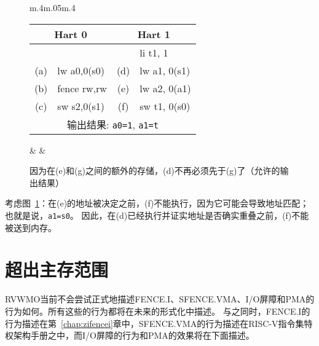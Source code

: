 \begin{figure}[h!]
  \centering
  \begin{tabular}{m{.4\linewidth}m{.05\linewidth}m{.4\linewidth}}
    \tt\small
    \begin{tabular}{cl||cl}
    \multicolumn{2}{c}{Hart 0} & \multicolumn{2}{c}{Hart 1} \\
    \hline
        &             &     & li t1, 1       \\
    (a) & lw a0,0(s0) & (d) & lw a1, 0(s1)   \\
    (b) & fence rw,rw & (e) & lw a2, 0(a1)   \\
    (c) & sw s2,0(s1) & (f) & sw t1, 0(s0)   \\
    \hline
    \multicolumn{4}{c}{输出结果: {\tt a0=1}, {\tt a1=t}}
    \end{tabular}  
    & &
    
  \end{tabular}
  \caption{因为在(e)和(g)之间的额外的存储，(d)不再必须先于(g)了（允许的输出结果）
    }
  \label{fig:litmus:addrpo}
\end{figure}

考虑图~\ref{fig:litmus:addrpo}：在(e)的地址被决定之前，(f)不能执行，因为它可能会导致地址匹配；也就是说，{\tt a1=s0}。
因此，在(d)已经执行并证实地址是否确实重叠之前，(f)不能被送到内存。

\section{超出主存范围}

RVWMO当前不会尝试正式地描述FENCE.I、SFENCE.VMA、I/O屏障和PMA的行为如何。所有这些的行为都将在未来的形式化中描述。
与之同时，FENCE.I的行为描述在第~\ref{chap:zifencei}章中，SFENCE.VMA的行为描述在RISC-V指令集特权架构手册之中，而I/O屏障的行为和PMA的效果将在下面描述。

